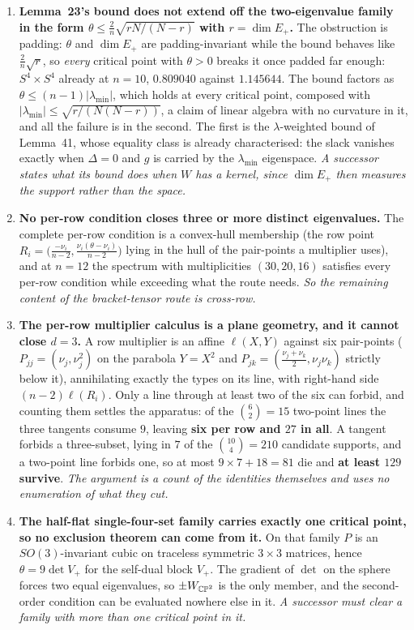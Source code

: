 \begin{enumerate}[leftmargin=1.8em]
\item \textbf{Lemma~23's bound does not extend off the two-eigenvalue family in the form $\theta\le\frac2n\sqrt{rN/(N-r)}$ with $r=\dim E_+$.} The obstruction is padding: $\theta$ and $\dim E_+$ are padding-invariant while the bound behaves like $\frac2n\sqrt r$, so \emph{every} critical point with $\theta>0$ breaks it once padded far enough: $S^4\times S^4$ already at $n=10$, $0.809040$ against $1.145644$. The bound factors as $\theta\le(n-1)|\lambda_{\min}|$, which holds at every critical point, composed with $|\lambda_{\min}|\le\sqrt{r/(N(N-r))}$, a claim of linear algebra with no curvature in it, and all the failure is in the second. The first is the $\lambda$-weighted bound of Lemma~41, whose equality class is already characterised: the slack vanishes exactly when $\Delta=0$ and $g$ is carried by the $\lambda_{\min}$ eigenspace. \emph{A successor states what its bound does when $W$ has a kernel, since $\dim E_+$ then measures the support rather than the space.}

\item \textbf{No per-row condition closes three or more distinct eigenvalues.} The complete per-row condition is a convex-hull membership (the row point $R_i=\big(\tfrac{-\nu_i}{n-2},\tfrac{\nu_i(\theta-\nu_i)}{n-2}\big)$ lying in the hull of the pair-points a multiplier uses), and at $n=12$ the spectrum with multiplicities $(30,20,16)$ satisfies every per-row condition while exceeding what the route needs. \emph{So the remaining content of the bracket-tensor route is cross-row.}

\item \textbf{The per-row multiplier calculus is a plane geometry, and it cannot close $d=3$.} A row multiplier is an affine $\ell(X,Y)$ against six pair-points ($P_{jj}=(\nu_j,\nu_j^2)$ on the parabola $Y=X^2$ and $P_{jk}=(\tfrac{\nu_j+\nu_k}2,\nu_j\nu_k)$ strictly below it), annihilating exactly the types on its line, with right-hand side $(n-2)\ell(R_i)$. Only a line through at least two of the six can forbid, and counting them settles the apparatus: of the $\binom62=15$ two-point lines the three tangents consume $9$, leaving \textbf{six per row and $27$ in all}. A tangent forbids a three-subset, lying in $7$ of the $\binom{10}4=210$ candidate supports, and a two-point line forbids one, so at most $9\times7+18=81$ die and \textbf{at least $129$ survive}. \emph{The argument is a count of the identities themselves and uses no enumeration of what they cut.}

\item \textbf{The half-flat single-four-set family carries exactly one critical point, so no exclusion theorem can come from it.} On that family $P$ is an $SO(3)$-invariant cubic on traceless symmetric $3\times3$ matrices, hence $\theta=9\det V_+$ for the self-dual block $V_+$. The gradient of $\det$ on the sphere forces two equal eigenvalues, so $\pm W_{\mathbb{CP}^2}$ is the only member, and the second-order condition can be evaluated nowhere else in it. \emph{A successor must clear a family with more than one critical point in it.}

\end{enumerate}

